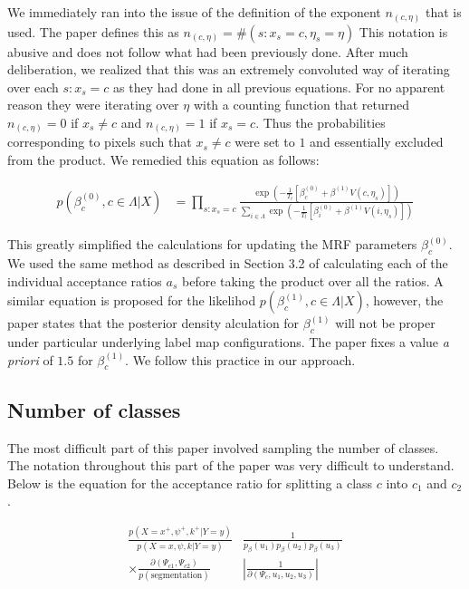\documentclass[11pt]{article}
\begin{document}
We immediately ran into the issue of the definition of the exponent $n_{(c, \eta)}$ that is used.
The paper defines this as $n_{(c, \eta)}=\#\left(s: x_{s}=c, \eta_{s}=\eta\right)$
This notation is abusive and does not follow what had been previously done.
After much deliberation, we realized that this was an extremely convoluted way of iterating over each $s:x_{s} = c$ as they had done in all previous equations.
For no apparent reason they were iterating over $\eta$ with a counting function that returned $n_{(c, \eta)}=0$ if $x_{s} \neq c$ and $n_{(c, \eta)}=1$ if $x_{s} = c$. Thus the probabilities corresponding to pixels such that $x_{s} \neq c$ were set to $1$ and essentially excluded from the product.
We remedied this equation as follows:

\begin{equation}
\begin{aligned}
p\left(\beta_{c}^{(0)}, c \in \Lambda | X\right) & = \prod_{s:x_{s} = c}\frac{\exp \left(-\frac{1}{T_{t}}\left[\beta_{c}^{(0)}+\beta^{(1)} V(c, \eta_{s})\right]\right)}{\sum_{i \in \Lambda} \exp \left(-\frac{1}{T_{t}}\left[\beta_{i}^{(0)}+\beta^{(1)} V(i, \eta_{s})\right]\right)}
\end{aligned}
\end{equation}

This greatly simplified the calculations for updating the MRF parameters  $\beta_{c}^{(0)}$.
We used the same method as described in Section 3.2 of calculating each of the individual acceptance ratios $a_{s}$ before taking the product over all the ratios.
A similar equation is proposed for the likelihod $p(\beta_{c}^{(1)}, c \in \Lambda | X)$, however, the paper states that the posterior density alculation for $\beta_{c}^{(1)}$ will not be proper under particular underlying label map configurations.
The paper fixes a value \textit{a priori} of $1.5$ for $\beta_{c}^{(1)}$.
We follow this practice in our approach.

\subsection{Number of classes}
The most difficult part of this paper involved sampling the number of classes.
The notation throughout this part of the paper was very difficult to understand.
Below is the equation for the acceptance ratio for splitting a class $c$ into $c_{1}$ and $c_{2}$.

\begin{equation}
\begin{aligned}
\frac{p\left(X=x^{+}, \psi^{+}, k^{+} | Y=y\right)}{p(X=x, \psi, k | Y=y)} & \frac{1}{p_{\beta}\left(u_{1}\right) p_{\beta}\left(u_{2}\right) p_{\beta}\left(u_{3}\right)} \\
\times \frac{\partial\left(\Psi_{c 1}, \Psi_{c 2}\right)}{p(\text {segmentation})} &\left|\frac{1}{\partial\left(\Psi_{c}, u_{1}, u_{2}, u_{3}\right)}\right|
\end{aligned}
\end{equation}
\end{document}
